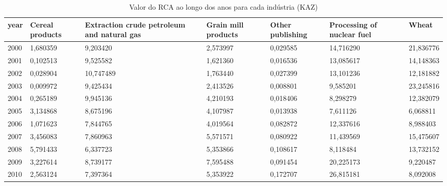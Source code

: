 \begin{table}
\centering
\caption{Valor do RCA ao longo dos anos para cada indústria (KAZ)}
\begin{tabular}{p{1cm}p{2cm}p{2cm}p{2cm}p{2cm}p{2cm}p{2cm}}
\toprule
 year &  Cereal products &  Extraction crude petroleum and natural gas &  Grain mill products &  Other publishing &  Processing of nuclear fuel &     Wheat \\
\midrule
 2000 &         1,680359 &                                    9,203420 &             2,573997 &          0,029585 &                   14,716290 & 21,836776 \\
 2001 &         0,102513 &                                    9,525582 &             1,621360 &          0,016536 &                   13,085617 & 14,148363 \\
 2002 &         0,028904 &                                   10,747489 &             1,763440 &          0,027399 &                   13,101236 & 12,181882 \\
 2003 &         0,009972 &                                    9,425434 &             2,413526 &          0,008801 &                    9,585201 & 23,245816 \\
 2004 &         0,265189 &                                    9,945136 &             4,210193 &          0,018406 &                    8,298279 & 12,382079 \\
 2005 &         3,134868 &                                    8,675196 &             4,107987 &          0,013938 &                    7,611126 &  6,068811 \\
 2006 &         1,071623 &                                    7,844765 &             4,019564 &          0,082872 &                   12,337616 &  8,988403 \\
 2007 &         3,456083 &                                    7,860963 &             5,571571 &          0,080922 &                   11,439569 & 15,475607 \\
 2008 &         5,791433 &                                    6,337723 &             5,353866 &          0,108617 &                    8,118484 & 13,732152 \\
 2009 &         3,227614 &                                    8,739177 &             7,595488 &          0,091454 &                   20,225173 &  9,220487 \\
 2010 &         2,563124 &                                    7,397364 &             5,353922 &          0,172707 &                   26,815181 &  8,092008 \\

\end{tabular}
\end{table}
